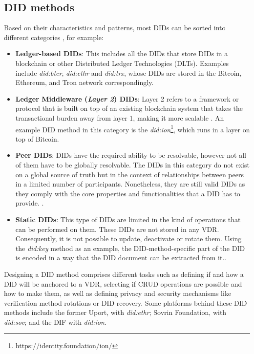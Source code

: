 \subsection{DID methods}\label{subsec:did_methods}

 Based on their characteristics and patterns, most DIDs can be sorted into different categories \cite{preukschat_reed_2021}, for example: 

\begin{itemize}
  \item \textbf{Ledger-based DIDs}: This includes all the DIDs that store DIDs in a blockchain or other Distributed Ledger Technologies (DLTs). Examples include \emph{did:btcr}, \emph{did:ethr} and \emph{did:trx}, whose DIDs are stored in the Bitcoin, Ethereum, and Tron network correspondingly.
  \item \textbf{Ledger Middleware (\emph{Layer 2}) DIDs}: Layer 2 refers to a framework or protocol that is built on top of an existing blockchain system that takes the transactional burden away from layer 1, making it more scalable \cite{weston_2022}. An example DID method in this category is the \emph{did:ion}\footnote{https://identity.foundation/ion/}, which runs in a layer on top of Bitcoin. 
  \item \textbf{Peer DIDs}: DIDs have the required ability to be resolvable, however not all of them have to be globally resolvable. The DIDs in this category do not exist on a global source of truth but in the context of relationships between peers in a limited number of participants. Nonetheless, they are still valid DIDs as they comply with the core properties and functionalities that a DID has to provide. \cite{preukschat_reed_2021}.
  \item \textbf{Static DIDs}: This type of DIDs are limited in the kind of operations that can be performed on them. These DIDs are not stored in any VDR. Consequently, it is not possible to update, deactivate or rotate them. Using the \emph{did:key} method as an example, the DID-method-specific part of the DID is encoded in a way that the DID document can be extracted from it.\cite{longley_zagidulin_sporny_2022}.
\end{itemize}

Designing a DID method comprises different tasks such as defining if and how a DID will be anchored to a VDR, selecting if CRUD operations are possible and how to make them, as well as defining privacy and security mechanisms like verification method rotations or DID recovery. Some platforms behind these DID methods include the former Uport, with \emph{did:ethr}; Sovrin Foundation, with \emph{did:sov}; and the DIF with \emph{did:ion}.

